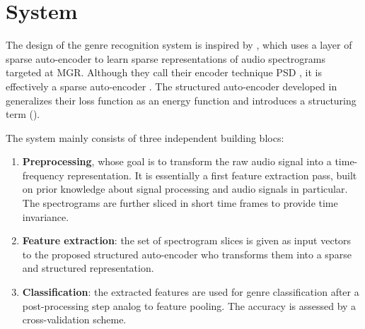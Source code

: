 





\chapter{System} \label{chap:system}

The design of the genre recognition system is inspired by \cite{lecun2011PSDaudio}, which uses a layer of sparse auto-encoder to learn sparse representations of audio spectrograms targeted at \gls{MGR}. Although they call their encoder technique \gls{PSD} \cite{lecun2010PSD}, it is effectively a sparse auto-encoder \cite{bengio2009learningDeepAI}. The structured auto-encoder developed in  generalizes their loss function as an energy function and introduces a structuring term ().

The system mainly consists of three independent building blocs:
\begin{enumerate}
	\item \textbf{Preprocessing}, whose goal is to transform the raw audio signal into a time-frequency representation. It is essentially a first feature extraction pass, built on prior knowledge about signal processing and audio signals in particular. The spectrograms are further sliced in short time frames to provide time invariance.
	\item \textbf{Feature extraction}: the set of spectrogram slices is given as input vectors to the proposed structured auto-encoder who transforms them into a sparse and structured representation.
	\item \textbf{Classification}: the extracted features are used for genre classification after a post-processing step analog to feature pooling. The accuracy is assessed by a cross-validation scheme.
\end{enumerate}

